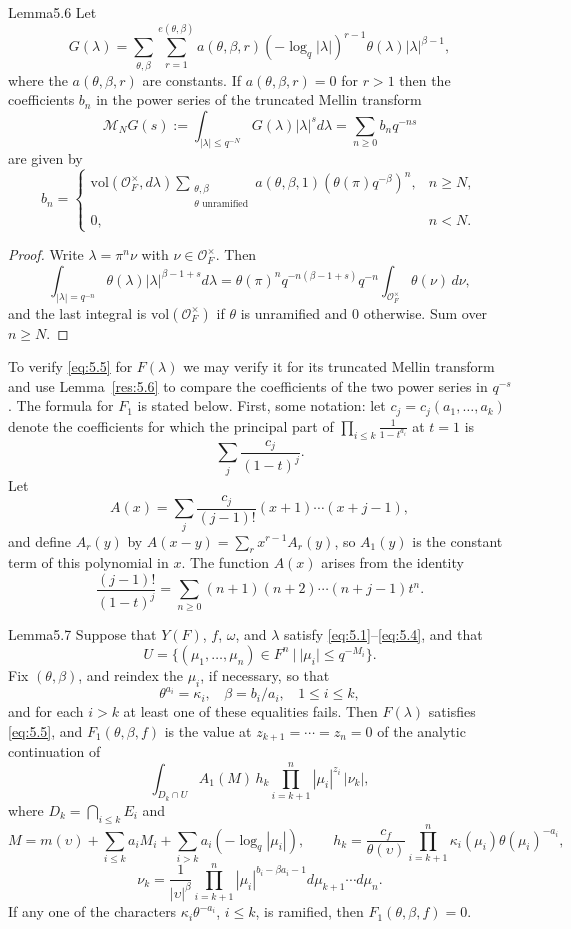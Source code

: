 \documentclass[12pt,letterpaper]{amsart}
\theoremstyle{plain}
\theoremstyle{definition}
\theoremstyle{remark}
\theoremstyle{definition}
\begin{document}
\begin{res}{Lemma}{5.6}\label{res:5.6}
Let
\[
G(\lambda) =\sum_{\theta,\beta}\sum_{r=1}^{e(\theta,\beta)}
a(\theta,\beta,r)(-\log_q|\lambda|)^{r-1}\theta(\lambda)|\lambda|^{\beta -1},
\]
where the $a(\theta,\beta,r)$ are constants. If
$a(\theta,\beta,r)=0$ for $r>1$ then
the coefficients $b_n$ in the power series of the
truncated Mellin transform
\[
\mathcal M_NG(s):=\int_{|\lambda|\leq q^{-N}}
G(\lambda)|\lambda|^sd\lambda =\sum_{n\geq 0}b_nq^{-ns}
\]
are given by
\[
b_n=
\begin{cases}
\mathrm{vol}({\mathcal O}_F^\times,d\lambda)
\sum_{\substack{ \theta,\beta\\ \theta\text{ unramified}}}
a(\theta,\beta,1)(\theta(\pi)q^{-\beta})^n,&n\geq N,\\
0,& n<N.
\end{cases}
\]
\end{res}

\begin{proof}
Write $\lambda=\pi^n\nu$ with $\nu\in\mathcal O_F^\times$. Then
\[
\int_{|\lambda|=q^{-n}}\theta(\lambda)|\lambda|^{\beta-1+s}d\lambda
=\theta(\pi)^nq^{-n(\beta-1+s)}q^{-n}\int_{\mathcal O_F^\times}\theta(\nu)\,d\nu,
\]
and the last integral is $\mathrm{vol}(\mathcal O_F^\times)$ if $\theta$ is
unramified and $0$ otherwise. Sum over $n\ge N$.
\end{proof}

To verify \eqref{eq:5.5} for $F(\lambda)$ we may
verify it for its truncated Mellin transform
and use Lemma~\ref{res:5.6} to compare the coefficients of
the two power series in $q^{-s}$. The formula for $F_1$ is stated below.
First, some notation: let $c_j=c_j(a_1,\dots,a_k)$ denote
the coefficients for which the principal part of
$\prod_{i\le k}\frac{1}{1-t^{a_i}}$ at $t=1$ is
\[
\sum_j\frac{c_j}{(1-t)^j}.
\]
Let
\[
A(x)=\sum_j \frac{c_j}{(j-1)!}(x+1)\cdots(x+j-1),
\]
and define $A_r(y)$ by $A(x-y)=\sum_r x^{r-1}A_r(y)$,
so $A_1(y)$ is the constant term of this polynomial in $x$.
The function $A(x)$ arises from the identity
\[
\frac{(j-1)!}{(1-t)^j}
=\sum_{n\geq 0}(n+1)(n+2)\cdots(n+j-1)t^n .
\]

\begin{res}{Lemma}{5.7}\label{res:5.7}
Suppose that $Y(F)$, $f$, $\omega$, and
$\lambda$ satisfy \eqref{eq:5.1}--\eqref{eq:5.4}, and that
\[
U=\{(\mu_1,\dots,\mu_n)\in F^n\ |\ |\mu_i|\leq q^{-M_i}\}.
\]
Fix $(\theta,\beta)$, and reindex the $\mu_i$, if necessary, so that
\[
\theta^{a_i}=\kappa_i,\ \ \ \ \beta=b_i/a_i,\ \ \ \
1\leq i\leq k,
\]
and for each $i>k$ at least one of these equalities fails.
Then $F(\lambda)$ satisfies \eqref{eq:5.5}, and
$F_1(\theta,\beta,f)$ is the value at $z_{k+1}=\cdots=z_n=0$ of
the analytic continuation of
\[
\int_{D_k\cap U}A_1(M)\,h_k\prod_{i=k+1}^n|\mu_i|^{z_i}\,|\nu_k|,
\]
where $D_k=\bigcap_{i\le k}E_i$ and
\[
M=m(\upsilon)+\sum_{i\leq k}a_iM_i +\sum_{i>k}a_i(-\log_q|\mu_i|),\qquad
h_k=\frac{c_f}{\theta(\upsilon)}
\prod_{i=k+1}^n\kappa_i(\mu_i)\theta(\mu_i)^{-a_i},
\]
\[
\nu_k=\frac{1}{|\upsilon|^\beta}
\prod_{i=k+1}^n|\mu_i|^{b_i-\beta a_i-1}d\mu_{k+1}\cdots d\mu_n.
\]
If any one of the characters $\kappa_i\theta^{-a_i}$, $i\le k$, is
ramified, then $F_1(\theta,\beta,f)=0$.
\end{res}
\end{document}
